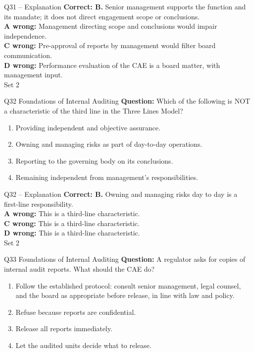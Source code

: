 \documentclass[aspectratio=169,10pt]{beamer}
\begin{document}
\begin{frame}[t]{Q31 -- Explanation}
	\footnotesize
	\textbf{Correct: B.} Senior management supports the function and its mandate; it does not direct engagement scope or conclusions. \\[5pt]
\textbf{A wrong:} Management directing scope and conclusions would impair independence. \\[3pt]
\textbf{C wrong:} Pre-approval of reports by management would filter board communication. \\[3pt]
\textbf{D wrong:} Performance evaluation of the CAE is a board matter, with management input. \\[3pt]
	\vfill {\tiny Set 2}
\end{frame}

\begin{frame}[t]{Q32 \hfill {\scriptsize Foundations of Internal Auditing}}
	\small
	\textbf{Question:} Which of the following is NOT a characteristic of the third line in the Three Lines Model?
	\begin{enumerate}[label=\Alph*.,itemsep=1pt,topsep=3pt]
			\item Providing independent and objective assurance.
			\item Owning and managing risks as part of day-to-day operations.
			\item Reporting to the governing body on its conclusions.
			\item Remaining independent from management's responsibilities.
	\end{enumerate}
\end{frame}

\begin{frame}[t]{Q32 -- Explanation}
	\footnotesize
	\textbf{Correct: B.} Owning and managing risks day to day is a first-line responsibility. \\[5pt]
\textbf{A wrong:} This is a third-line characteristic. \\[3pt]
\textbf{C wrong:} This is a third-line characteristic. \\[3pt]
\textbf{D wrong:} This is a third-line characteristic. \\[3pt]
	\vfill {\tiny Set 2}
\end{frame}

\begin{frame}[t]{Q33 \hfill {\scriptsize Foundations of Internal Auditing}}
	\small
	\textbf{Question:} A regulator asks for copies of internal audit reports. What should the CAE do?
	\begin{enumerate}[label=\Alph*.,itemsep=1pt,topsep=3pt]
			\item Follow the established protocol: consult senior management, legal counsel, and the board as appropriate before release, in line with law and policy.
			\item Refuse because reports are confidential.
			\item Release all reports immediately.
			\item Let the audited units decide what to release.
	\end{enumerate}
\end{frame}
\end{document}
